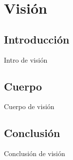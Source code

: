 \section{Visi\'on}

\subsection{Introducci\'on}
Intro de visi\'on

\subsection{Cuerpo}
Cuerpo de visi\'on

\subsection{Conclusi\'on}
Conclusi\'on de visi\'on

